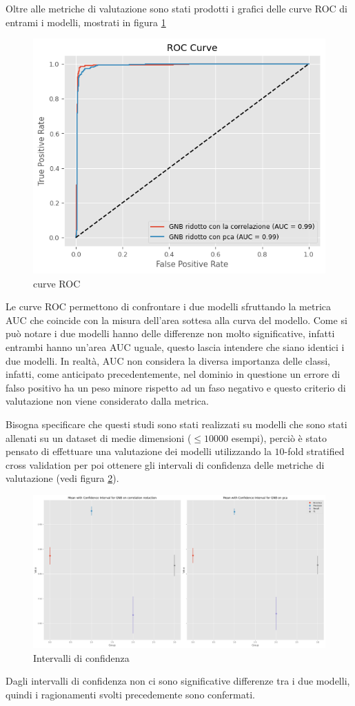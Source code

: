 Oltre alle metriche di valutazione sono stati prodotti i grafici delle curve ROC
di entrami i modelli, mostrati in figura \ref{fig:curve_roc}

\begin{figure}[!ht]
    \centering
    \includegraphics[width=.7\textwidth]{img/gnb/roc_curve.png}
    \caption{curve ROC}
    \label{fig:curve_roc}
\end{figure}

Le curve ROC permettono di confrontare i due modelli sfruttando la metrica AUC 
che coincide con la misura dell'area sottesa alla curva del modello. 
Come si può notare i due modelli hanno delle differenze non molto significative,
infatti entrambi hanno un'area AUC uguale, questo lascia intendere che siano 
identici i due modelli. In realtà, AUC non considera la diversa importanza delle 
classi, infatti, come anticipato precedentemente, nel dominio in questione un errore 
di falso positivo ha un peso minore rispetto ad un faso negativo e questo criterio
di valutazione non viene considerato dalla metrica. 

Bisogna specificare che questi studi sono stati realizzati su modelli che sono stati
allenati su un dataset di medie dimensioni ($\le 10000$ esempi), perciò è stato 
pensato di effettuare una valutazione dei modelli utilizzando la $10$-fold 
stratified cross validation per poi ottenere gli intervali di confidenza delle 
metriche di valutazione (vedi figura \ref{fig:intervalli_confidenza}).

\begin{figure}[!ht]
    \centering
    \includegraphics[width=\textwidth]{img/gnb/intervalli_confidenza.png}
    \caption{Intervalli di confidenza}
    \label{fig:intervalli_confidenza}
\end{figure}

Dagli intervalli di confidenza non ci sono significative differenze tra i due modelli,
quindi i ragionamenti svolti precedemente sono confermati.